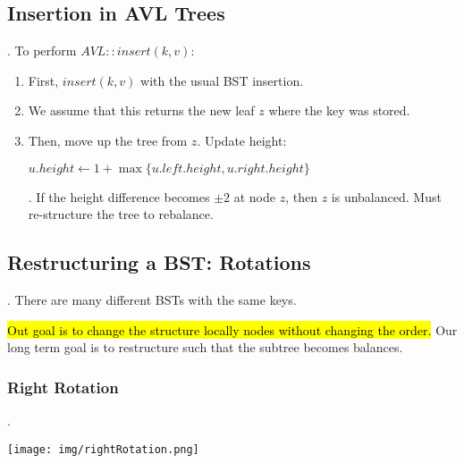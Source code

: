 \documentclass{article}
\begin{document}
\subsection{Insertion in AVL Trees}

\begin{algo}[].
    To perform $AVL::insert(k, v)$: 
    \begin{enumerate}
        \item First, $insert(k,v)$ with the usual BST insertion. 
        \item We assume that this returns the new leaf $z$ where the key was stored. 
        \item Then, move up the tree from $z$. Update height: \\ 
        \begin{algorithm}[H]
            \caption{$set\_height\_from\_subtrees(u)$} 
            $u.height \leftarrow 1 + \max \{ u.left.height, u.right.height \}$
        \end{algorithm}
        \begin{comm}[].
            If the height difference becomes $\pm 2$ at node $z$, then $z$ is unbalanced. Must re-structure the tree to rebalance.
        \end{comm}
    \end{enumerate}
\end{algo}

\subsection{Restructuring a BST: Rotations} 

\begin{discovery}[].
    There are many different BSTs with the same keys.
\end{discovery}

\hl{Out goal is to change the structure locally nodes without changing the order.} Our long term goal is to restructure such that the subtree becomes balances. 

\subsubsection{Right Rotation}

\begin{examplee}[].
    \begin{center}
        \texttt{[image: img/rightRotation.png]}
    \end{center}
\end{examplee}
\end{document}
